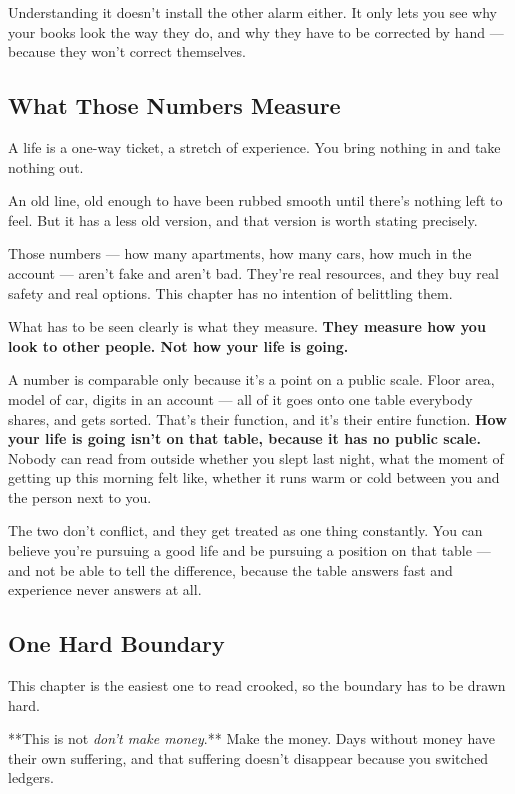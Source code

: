 \documentclass[11pt,a4paper]{article}
\begin{document}
Understanding it doesn't install the other alarm either. It only lets you see why your books look the way they do, and why they have to be corrected by hand --- because they won't correct themselves.

\subsection{What Those Numbers Measure}

A life is a one-way ticket, a stretch of experience. You bring nothing in and take nothing out.

An old line, old enough to have been rubbed smooth until there's nothing left to feel. But it has a less old version, and that version is worth stating precisely.

Those numbers --- how many apartments, how many cars, how much in the account --- aren't fake and aren't bad. They're real resources, and they buy real safety and real options. This chapter has no intention of belittling them.

What has to be seen clearly is what they measure. \textbf{They measure how you look to other people. Not how your life is going.}

A number is comparable only because it's a point on a public scale. Floor area, model of car, digits in an account --- all of it goes onto one table everybody shares, and gets sorted. That's their function, and it's their entire function. \textbf{How your life is going isn't on that table, because it has no public scale.} Nobody can read from outside whether you slept last night, what the moment of getting up this morning felt like, whether it runs warm or cold between you and the person next to you.

The two don't conflict, and they get treated as one thing constantly. You can believe you're pursuing a good life and be pursuing a position on that table --- and not be able to tell the difference, because the table answers fast and experience never answers at all.

\subsection{One Hard Boundary}

This chapter is the easiest one to read crooked, so the boundary has to be drawn hard.

**This is not \textit{don't make money}.** Make the money. Days without money have their own suffering, and that suffering doesn't disappear because you switched ledgers.
\end{document}
